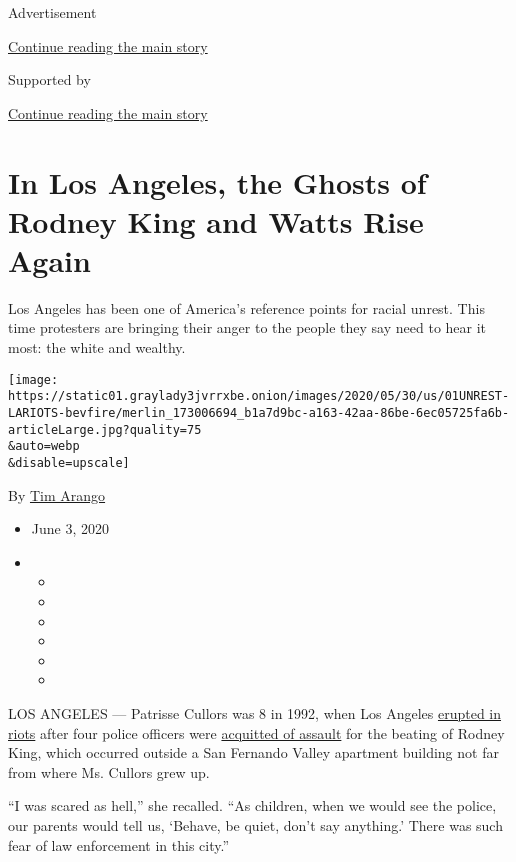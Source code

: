 Advertisement

\protect\hyperlink{after-top}{Continue reading the main story}

Supported by

\protect\hyperlink{after-sponsor}{Continue reading the main story}

\hypertarget{in-los-angeles-the-ghosts-of-rodney-king-and-watts-rise-again}{%
\section{In Los Angeles, the Ghosts of Rodney King and Watts Rise
Again}\label{in-los-angeles-the-ghosts-of-rodney-king-and-watts-rise-again}}

Los Angeles has been one of America's reference points for racial
unrest. This time protesters are bringing their anger to the people they
say need to hear it most: the white and wealthy.

\texttt{[image: https://static01.graylady3jvrrxbe.onion/images/2020/05/30/us/01UNREST-LARIOTS-bevfire/merlin\_173006694\_b1a7d9bc-a163-42aa-86be-6ec05725fa6b-articleLarge.jpg?quality=75\\\&auto=webp\\\&disable=upscale]}

By \href{https://www.nytimes3xbfgragh.onion/by/tim-arango}{Tim Arango}

\begin{itemize}
\item
  June 3, 2020
\item
  \begin{itemize}
  \item
  \item
  \item
  \item
  \item
  \item
  \end{itemize}
\end{itemize}

LOS ANGELES --- Patrisse Cullors was 8 in 1992, when Los Angeles
\href{https://www.nytimes3xbfgragh.onion/1992/05/05/us/riots-los-angeles-overview-rioting-mounted-gates-remained-political-event.html}{erupted
in riots} after four police officers were
\href{https://archive.nytimes3xbfgragh.onion/www.nytimes3xbfgragh.onion/books/98/02/08/home/rodney-verdict.html}{acquitted
of assault} for the beating of Rodney King, which occurred outside a San
Fernando Valley apartment building not far from where Ms. Cullors grew
up.

``I was scared as hell,'' she recalled. ``As children, when we would see
the police, our parents would tell us, `Behave, be quiet, don't say
anything.' There was such fear of law enforcement in this city.''

